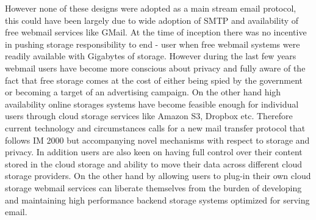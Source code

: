 However none of these designs were adopted as a main stream email protocol, this
could have been largely due to wide adoption of SMTP and availability of free
webmail services like GMail\cite{GMail}. At the time of inception there was no 
incentive in pushing storage responsibility to end - user when free webmail 
systems  were readily available with Gigabytes of storage. However during the 
last few years webmail users have become more conscious about privacy and fully 
aware of the fact that free storage comes at the cost of either being spied by 
the  government or becoming a target of an advertising campaign. On the other 
hand high availability online storages systems have become feasible enough for 
individual users through cloud storage services like Amazon S3\cite{AWS-S3},
Dropbox\cite{DRPBX} etc. Therefore current technology and circumstances calls 
for a new mail transfer protocol that follows IM 2000 but accompanying novel 
mechanisms with respect to storage and privacy. In addition users are also keen 
on having full control over their content stored in the cloud storage and ability 
to move their data across different cloud storage providers. On the other hand by 
allowing users to plug-in their own cloud storage webmail services can liberate 
themselves from the burden of developing and maintaining high performance backend 
storage systems optimized for serving email.


